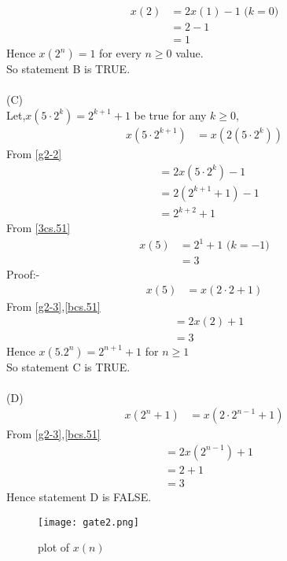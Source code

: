 \documentclass[journal,12pt,twocolumn]{IEEEtran}
\theoremstyle{remark}
\begin{document}
\begin{align}
	x(2)&=2x(1)-1\text{  ($k=0$)}\\
	&=2-1\\
	&=1\label{bcs.51}
\end{align}
Hence $x(2^n)=1$ for every $n\geq0$ value.\\
So statement B is TRUE.\\
\\(C)\\
Let,$x(5\cdot2^k)=2^{k+1}+1$ be true for any $k\geq0$,
\begin{align}
	x(5\cdot2^{k+1})&=x(2(5\cdot2^k))
\end{align}
From \eqref{g2-2}
\begin{align}
	&=2x(5\cdot2^k)-1\\
        &=2(2^{k+1}+1)-1\\
	&=2^{k+2}+1\label{3cs.51}
\end{align}
From \eqref{3cs.51}
\begin{align}
	x(5)&=2^1+1\text{  ($k=-1$)}\\
	&=3
\end{align}
Proof:-
\begin{align}
        x(5)&=x(2\cdot2+1)
\end{align}
From \eqref{g2-3},\eqref{bcs.51}
\begin{align}
        &=2x(2)+1\\
        &=3
\end{align}
Hence $x(5.2^n)=2^{n+1}+1$ for $n\geq1$\\
So statement C is TRUE.\\
\\(D)
\begin{align}
	x(2^n+1)&=x(2\cdot2^{n-1}+1)
\end{align}
From \eqref{g2-3},\eqref{bcs.51}
\begin{align}
	&=2x(2^{n-1})+1\\
	&=2+1\\
	&=3
\end{align}
Hence statement D is FALSE.
\begin{figure}
	\centering
	\texttt{[image: gate2.png]}
	\caption{plot of $x(n)$}
	\label{cs.51.stem}
\end{figure}
\end{document}
